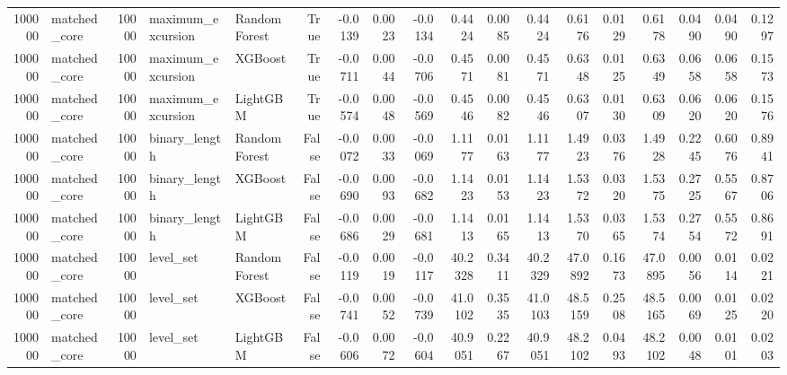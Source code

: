 \begin{table}
\begin{tabular}{rlrllrrrrrrrrrrrrr}
100000 & matched_core & 10000 & maximum_excursion & RandomForest & True & -0.0139 & 0.0023 & -0.0134 & 0.4424 & 0.0085 & 0.4424 & 0.6176 & 0.0129 & 0.6178 & 0.0490 & 0.0490 & 0.1297 \\
100000 & matched_core & 10000 & maximum_excursion & XGBoost & True & -0.0711 & 0.0044 & -0.0706 & 0.4571 & 0.0081 & 0.4571 & 0.6348 & 0.0125 & 0.6349 & 0.0658 & 0.0658 & 0.1573 \\
100000 & matched_core & 10000 & maximum_excursion & LightGBM & True & -0.0574 & 0.0048 & -0.0569 & 0.4546 & 0.0082 & 0.4546 & 0.6307 & 0.0130 & 0.6309 & 0.0620 & 0.0620 & 0.1576 \\
100000 & matched_core & 10000 & binary_length & RandomForest & False & -0.0072 & 0.0033 & -0.0069 & 1.1177 & 0.0163 & 1.1177 & 1.4923 & 0.0376 & 1.4928 & 0.2245 & 0.6076 & 0.8941 \\
100000 & matched_core & 10000 & binary_length & XGBoost & False & -0.0690 & 0.0093 & -0.0682 & 1.1423 & 0.0153 & 1.1423 & 1.5372 & 0.0320 & 1.5375 & 0.2725 & 0.5567 & 0.8706 \\
100000 & matched_core & 10000 & binary_length & LightGBM & False & -0.0686 & 0.0029 & -0.0681 & 1.1413 & 0.0165 & 1.1413 & 1.5370 & 0.0365 & 1.5374 & 0.2754 & 0.5572 & 0.8691 \\
100000 & matched_core & 10000 & level_set & RandomForest & False & -0.0119 & 0.0019 & -0.0117 & 40.2328 & 0.3411 & 40.2329 & 47.0892 & 0.1673 & 47.0895 & 0.0056 & 0.0114 & 0.0221 \\
100000 & matched_core & 10000 & level_set & XGBoost & False & -0.0741 & 0.0052 & -0.0739 & 41.0102 & 0.3535 & 41.0103 & 48.5159 & 0.2508 & 48.5165 & 0.0069 & 0.0125 & 0.0220 \\
100000 & matched_core & 10000 & level_set & LightGBM & False & -0.0606 & 0.0072 & -0.0604 & 40.9051 & 0.2267 & 40.9051 & 48.2102 & 0.0493 & 48.2102 & 0.0048 & 0.0101 & 0.0203 \\
\bottomrule
\end{tabular}
\end{table}
